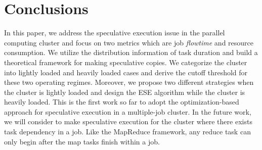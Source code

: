 \documentclass[10pt,conference]{IEEEtran}
\begin{document}
\section{Conclusions}
\label{conclusions}
In this paper, we address the speculative execution issue in the parallel computing cluster and focus on two metrics which are job \textit{flowtime} and resource consumption. We utilize the distribution information of task duration and build a theoretical framework for making speculative copies. We categorize the cluster into lightly loaded and heavily loaded cases and derive the cutoff threshold for these two operating regimes. Moreover, we propose two different strategies when the cluster is lightly loaded and design the ESE algorithm while the cluster is heavily loaded. This is the first work so far to adopt the optimization-based approach for speculative execution in a multiple-job cluster. In the future work, we will consider to make speculative execution for the cluster where there exists task dependency in a job. Like the MapReduce framework, any reduce task can only begin after the map tasks finish within a job.



\end{document}
